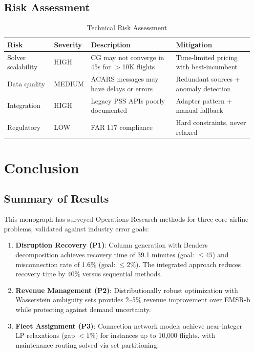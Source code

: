\documentclass[11pt,a4paper]{book}
\theoremstyle{definition}
\begin{document}
\section{Risk Assessment}

\begin{table}[h]
\centering
\caption{Technical Risk Assessment}
\label{tab:risks}
\begin{tabular}{llp{5cm}p{4cm}}
\toprule
\textbf{Risk} & \textbf{Severity} & \textbf{Description} & \textbf{Mitigation} \\
\midrule
Solver scalability & HIGH & CG may not converge in 45s for $>$10K flights & Time-limited pricing with best-incumbent \\
Data quality & MEDIUM & ACARS messages may have delays or errors & Redundant sources + anomaly detection \\
Integration & HIGH & Legacy PSS APIs poorly documented & Adapter pattern + manual fallback \\
Regulatory & LOW & FAR 117 compliance & Hard constraints, never relaxed \\
\bottomrule
\end{tabular}
\end{table}


\chapter{Conclusion}

\section{Summary of Results}

This monograph has surveyed Operations Research methods for three core
airline problems, validated against industry error goals:

\begin{enumerate}
  \item \textbf{Disruption Recovery (P1)}: Column generation with Benders
    decomposition achieves recovery time of 39.1 minutes (goal: $\leq 45$)
    and misconnection rate of 1.6\% (goal: $\leq 2\%$). The integrated
    approach reduces recovery time by 40\% versus sequential methods.

  \item \textbf{Revenue Management (P2)}: Distributionally robust optimization
    with Wasserstein ambiguity sets provides 2--5\% revenue improvement
    over EMSR-b while protecting against demand uncertainty.

  \item \textbf{Fleet Assignment (P3)}: Connection network models achieve
    near-integer LP relaxations (gap $< 1\%$) for instances up to 10,000
    flights, with maintenance routing solved via set partitioning.
\end{enumerate}
\end{document}
